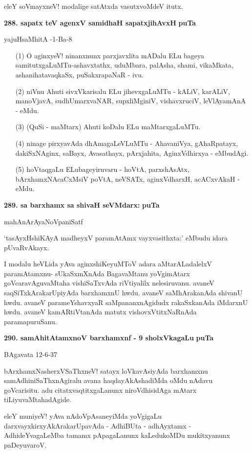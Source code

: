 \smallskip
eleY soVmayxneV! modalige satAtxda vasutxvoMdeV itutx.

\medskip
\noindent
\textbf{288. sapatx teV agenxV samidhaH sapatxjihAvxH} \hfill{\bf puTa \pageref{210}}

\hfill{yajuHsaMhitA -1-Ba-8}

\begin{itemize}
\item[(1)] O aginxyeV! ninanxnunx parxjavxlita mADalu ELu bageya samitutxgaLuMTu-\break ashavxtathx, uduMbara, palAsha, shami, vikaMkata, ashanihatavaqkaSx, puSakxrapaNaR - ivu.
\item[(2)] niVnu Ahuti sivxVkarisalu ELu jihevxgaLuMTu - kALiV, karALiV, manoVjavA, sudhUmarxvaNAR, supxliMginiV, vishavxruciV, leVlAyamAnA - eMdu.
\item[(3)] (QuSi - maMtarx) Ahuti koDalu ELu maMtarxgaLuMTu.
\item[(4)] ninage pirxyavAda dhAmagaLeVLuMTu - AhavaniVya, gAhaRpatayx, dakiSxNAginx, saBayx, Avasathayx, pArx\-jahita, AginxVdhirxya - eMbudAgi.
\item[(5)] hoVtaqgaLu ELubageyiruvaru - hoVtA, parxshAsAtx, bArxhamxNAcaCxMsiV poVtA, neVSATx, aginxVdharxH, acACxvAkaH - eMdu.
\end{itemize}

\medskip
\noindent
\textbf{289. sa barxhamx sa shivaH seVMdarx:} \hfill{\bf puTa \pageref{146}}

\hfill{mahAnArAyaNoVpaniSatf}

\smallskip
`tasAyxHshiKAyA madheyxV paramAtAmx vayxvasithxta:' eMbudu idara pUvaRvAkayx.

I modalu heVLida yAva aginxshiKeyuMToV adara aMtarALadalelxV paramAtamxnu- sUkaSxmX\-nAda BagavaMtanu yoVgimAtarx goVcaravAguvaMtaha vishiSaTxvAda riVtiyalilx nelesiruvanu. avaneV saqSiTxkAraka\-rUpiyAda barxhamxnU hwdu. avaneV saMhArakanAda shivanU hwdu. avaneV parameYshavxyaR saMpananx\-nAgidudx rakaSxka\-nAda iMdarxnU hwdu. avaneV kamARtiVtanAda matutx vishovxVtitxNaRnAda parama\-puruSanu.

\medskip
\noindent
\textbf{290. samAhitAtamxnoV barxhamxnf - 9 sholxVkagaLu} \hfill{\bf puTa \pageref{144}}

\hfill{BAgavata 12-6-37}

\smallskip
bArxhamxNasherxVSaThxneV! satayx loVkavAsiyAda barxhamxnu samAdhiniSaThxnAgiralu avana haqdayAkAsha\-diMda oMdu nAdavu goVcarisitu. adu citatxvaqtitxgaLanunx niroVdhisidAga mAtarx tiLiyuvaMtahadAgide.

eleY muniyeV! yAva nAdoVpAsaneyiMda yoVgigaLu darxvayxkirxyAkAraka\-rUpavAda - Adhi\-BUta - adhAyxtamx - AdhideYvagaLeMba tamamx pApagaLanunx kaLedukoMDu mukitxyanunx paDeyuvaroV.

